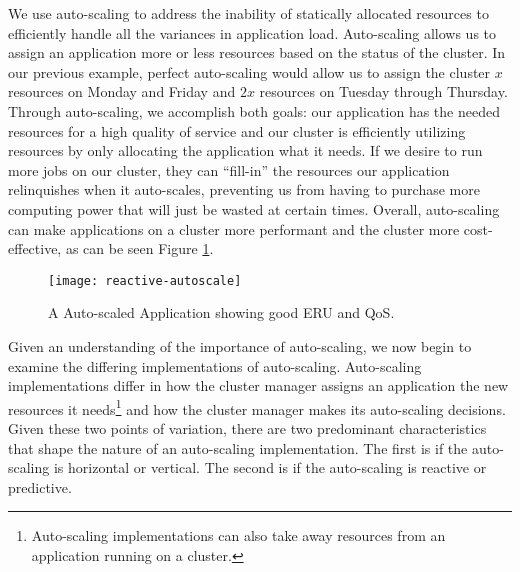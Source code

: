 We use auto-scaling to address the inability of statically allocated
resources to efficiently handle all the variances in application load.
Auto-scaling allows us to assign an application more or less resources based on
the status of the cluster. In our previous example, perfect auto-scaling
would allow us to assign the cluster $x$ resources on Monday and Friday and
$2x$ resources on Tuesday through Thursday. Through auto-scaling, we accomplish
both goals: our application has the needed resources for a high quality
of service and our cluster is efficiently utilizing resources by only
allocating the application what it needs. If we desire to run more jobs on our
cluster, they can ``fill-in'' the resources our application relinquishes when it
auto-scales, preventing us from having to purchase more computing power that
will just be wasted at certain times.
Overall, auto-scaling can make applications on a cluster more performant and
the cluster more cost-effective, as can be seen Figure
\ref{fig:reactive-autoscale}.

\begin{figure}[!h]
  \centerline{\texttt{[image: reactive-autoscale]}}
  \caption{A Auto-scaled Application showing good ERU and QoS.}
  \label{fig:reactive-autoscale}
\end{figure}

Given an understanding of the importance of auto-scaling, we now begin to
examine the differing implementations of auto-scaling. Auto-scaling
implementations differ in how the cluster manager
assigns an application the new resources it
needs\footnote{Auto-scaling implementations can also take away resources from
an application running on a cluster.} and how the cluster manager makes its
auto-scaling decisions. Given these two points of
variation, there are two predominant characteristics that shape the nature of an auto-scaling
implementation. The first is if the auto-scaling is horizontal or vertical. The
second is if the auto-scaling is reactive or predictive.

